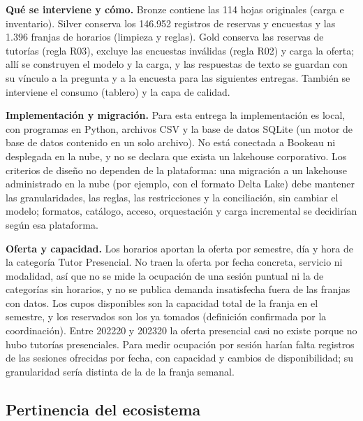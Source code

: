 \documentclass[11pt,letterpaper]{article}
\begin{document}
\textbf{Qué se interviene y cómo.} Bronze contiene las 114 hojas originales (carga e inventario). Silver conserva los 146.952 registros de reservas y encuestas y las 1.396 franjas de horarios (limpieza y reglas). Gold conserva las reservas de tutorías (regla R03), excluye las encuestas inválidas (regla R02) y carga la oferta; allí se construyen el modelo y la carga, y las respuestas de texto se guardan con su vínculo a la pregunta y a la encuesta para las siguientes entregas. También se interviene el consumo (tablero) y la capa de calidad.

\textbf{Implementación y migración.} Para esta entrega la implementación es local, con programas en Python, archivos CSV y la base de datos SQLite (un motor de base de datos contenido en un solo archivo). No está conectada a Bookeau ni desplegada en la nube, y no se declara que exista un lakehouse corporativo. Los criterios de diseño no dependen de la plataforma: una migración a un lakehouse administrado en la nube (por ejemplo, con el formato Delta Lake) debe mantener las granularidades, las reglas, las restricciones y la conciliación, sin cambiar el modelo; formatos, catálogo, acceso, orquestación y carga incremental se decidirían según esa plataforma.

\textbf{Oferta y capacidad.} Los horarios aportan la oferta por semestre, día y hora de la categoría Tutor Presencial. No traen la oferta por fecha concreta, servicio ni modalidad, así que no se mide la ocupación de una sesión puntual ni la de categorías sin horarios, y no se publica demanda insatisfecha fuera de las franjas con datos. Los cupos disponibles son la capacidad total de la franja en el semestre, y los reservados son los ya tomados (definición confirmada por la coordinación). Entre 202220 y 202320 la oferta presencial casi no existe porque no hubo tutorías presenciales. Para medir ocupación por sesión harían falta registros de las sesiones ofrecidas por fecha, con capacidad y cambios de disponibilidad; su granularidad sería distinta de la de la franja semanal.

\subsection{Pertinencia del ecosistema}
\end{document}
